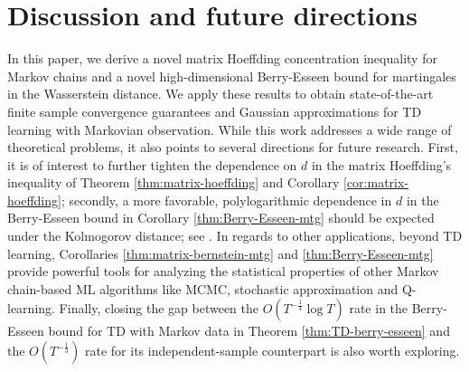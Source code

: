\section{Discussion and future directions}

In this paper, we derive a novel matrix Hoeffding concentration inequality for Markov chains and a novel high-dimensional Berry-Esseen bound for martingales in the Wasserstein distance. 
We apply these results to obtain state-of-the-art finite sample convergence guarantees and Gaussian approximations for TD learning with Markovian observation. 
While this work addresses a wide range of theoretical problems, it also points to several directions for future research. First, it is of interest to further tighten the dependence on $d$ in the matrix Hoeffding's inequality of Theorem \ref{thm:matrix-hoeffding} and Corollary \ref{cor:matrix-hoeffding}; secondly, a more favorable, polylogarithmic dependence in $d$ in the Berry-Esseen bound in Corollary \ref{thm:Berry-Esseen-mtg} should be expected under the Kolmogorov distance; see \cite{KOJEVNIKOV2022109448}. In regards to other applications, beyond TD learning, Corollaries \ref{thm:matrix-bernstein-mtg} and \ref{thm:Berry-Esseen-mtg} provide powerful tools for analyzing the statistical properties of other Markov chain-based ML algorithms like MCMC, stochastic approximation and Q-learning. Finally, closing the gap between the $O(T^{-\frac{1}{4}}\log T)$ rate in the Berry-Esseen bound for TD with Markov data in Theorem \ref{thm:TD-berry-esseen} and the $O(T^{-\frac{1}{3}})$ rate for its independent-sample counterpart is also worth exploring.


